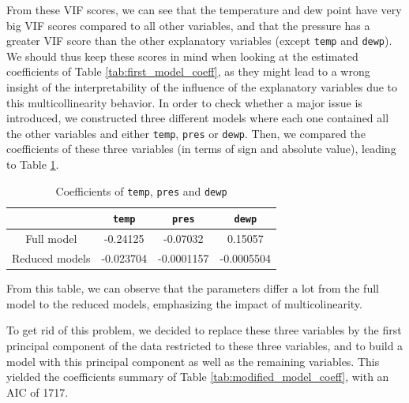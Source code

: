 \documentclass[a4paper, 12pt]{article}
\begin{document}
	From these VIF scores, we can see that the temperature and dew point have very big VIF scores compared to all other variables, and that the pressure has a greater VIF score than the other explanatory variables (except \texttt{temp} and \texttt{dewp}). We should thus keep these scores in mind when looking at the estimated coefficients of Table \ref{tab:first_model_coeff}, as they might lead to a wrong insight of the interpretability of the influence of the explanatory variables due to this multicollinearity behavior. In order to check whether a major issue is introduced, we constructed three different models where each one contained all the other variables and either \texttt{temp}, \texttt{pres} or \texttt{dewp}. Then, we compared the coefficients of these three variables (in terms of sign and absolute value), leading to Table \ref{tab:pres_dewp_temp_coeff}.
	
	\begin{table}[h]
	    \centering
	    \begin{tabular}{|c|c|c|c|}
	        \cline{2-4}
    	    \multicolumn{1}{c|}{} & \texttt{temp} & \texttt{pres} & \texttt{dewp} \\ \hline
    	    Full model & -0.24125 & -0.07032 & 0.15057 \\ \hline
    	    Reduced models & -0.023704 & -0.0001157 & -0.0005504 \\ \hline
	    \end{tabular}
	    \caption{Coefficients of \texttt{temp}, \texttt{pres} and \texttt{dewp}}
	    \label{tab:pres_dewp_temp_coeff}
	\end{table}
	From this table, we can observe that the parameters differ a lot from the full model to the reduced models, emphasizing the impact of multicolinearity.
	
	To get rid of this problem, we decided to replace these three variables by the first principal component of the data restricted to these three variables, and to build a model with this principal component as well as the remaining variables. This yielded the coefficients summary of Table
	\ref{tab:modified_model_coeff}, with an AIC of 1717.
	
\end{document}
